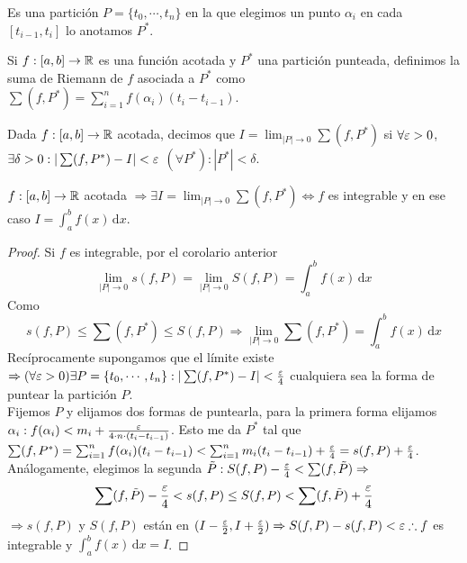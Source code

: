 \begin{definition}
  Es una partición $P = \{t_0, \cdots, t_n\}$ en la que elegimos un punto $\alpha_i$ en cada $[t_{i-1}, t_i]$ lo anotamos $P^*$.
\end{definition}

\begin{definition}
  Si $f: [a,b] \to \mathbb{R}$ es una función acotada y $P^*$ una partición punteada, definimos la suma de Riemann de $f$ asociada a $P^*$ como $\sum (f, P^*) = \sum_{i = 1}^n f(\alpha_i) (t_i - t_{i-1})$. 
\end{definition}

\begin{definition}
  Dada $f: [a, b] \to \mathbb{R}$ acotada, decimos que $I = \lim_{|P| \to 0} \sum (f, P^*)$ si $\forall \varepsilon > 0$, $\exists \delta > 0 : | \sum (f, P^*) - I| < \varepsilon$ $(\forall P^*) : |P^*| < \delta$.
\end{definition}

\begin{theorem}
  $f: [a, b] \to \mathbb{R}$ acotada $\Rightarrow \exists I = \lim_{|P| \to 0} \sum (f, P^*) \iff f$ es integrable y en ese caso $I = \int_a^b f(x) \, \mathrm{d}x$. 
  \begin{proof}
    Si $f$ es integrable, por el corolario anterior \begin{equation}
      \lim_{|P| \to 0} s(f, P) = \lim_{|P| \to 0} S(f, P) = \int_a^b f(x) \, \mathrm{d}x
    \end{equation}
    Como \begin{equation}s(f, P) \leq \sum(f, P^*) \leq S(f, P) \Rightarrow \lim_{|P| \to 0} \sum(f, P^*) = \int_a^b f(x) \, \mathrm{d}x \end{equation}
    Recíprocamente supongamos que el límite existe $\Rightarrow (\forall \varepsilon > 0) \exists P = \{ t_0, \cdots, t_n \} : |\sum (f, P^*) - I| < \frac{\varepsilon}{4}$ cualquiera sea la forma de puntear la partición $P$. \\
    Fijemos $P$ y elijamos dos formas de puntearla, para la primera forma elijamos $\alpha_i : f(\alpha_i) < m_i + \frac{\varepsilon}{4 \cdot n \cdot (t_i - t_{i-1})}$. Esto me da $P^*$ tal que $\sum (f, P^*) = \sum_{i = 1}^n f(\alpha_i) (t_i - t_{i-1}) < \sum_{i = 1}^n m_i (t_i - t_{i-1}) + \frac{\varepsilon}{4} = s(f, P) + \frac{\varepsilon}{4}$. \\
    Análogamente, elegimos la segunda $\tilde{P} : S(f, P) - \frac{\varepsilon}{4} < \sum (f, \tilde{P}) \Rightarrow$
    \begin{equation}
      \sum (f, \tilde{P}) - \frac{\varepsilon}{4} < s(f, P) \leq S(f, P) < \sum (f, \tilde{P}) + \frac{\varepsilon}{4}
    \end{equation}
    $\Rightarrow s(f, P)$ y $S(f, P)$ están en $(I - \frac{\varepsilon}{2}, I + \frac{\varepsilon}{2}) \Rightarrow S(f, P)- s(f, P) < \varepsilon \therefore f$ es integrable y $\int_a^b f(x) \, \mathrm{d}x = I$.
  \end{proof}
\end{theorem}

